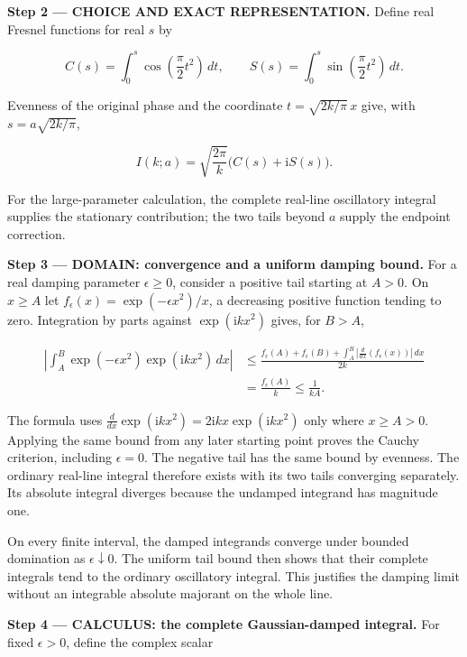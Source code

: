 \documentclass[11pt,oneside,openany]{book}
\begin{document}
\begin{ChoiceStep}
\textbf{Step 2 --- CHOICE AND EXACT REPRESENTATION.} Define real Fresnel functions for real \(s\) by

\[
C(s)=\int_0^s\cos\left(\frac\pi2t^2\right)\,dt,
\qquad
S(s)=\int_0^s\sin\left(\frac\pi2t^2\right)\,dt.
\]

Evenness of the original phase and the coordinate \(t=\sqrt{2k/\pi}\,x\) give, with \(s=a\sqrt{2k/\pi}\),

\[
I(k;a)=\sqrt{\frac{2\pi}{k}}\bigl(C(s)+\mathrm{i}S(s)\bigr).
\]

For the large-parameter calculation, the complete real-line oscillatory integral supplies the stationary contribution; the two tails beyond \(a\) supply the endpoint correction.

\end{ChoiceStep}
\begin{DomainStep}
\textbf{Step 3 --- DOMAIN: convergence and a uniform damping bound.} For a real damping parameter \(\epsilon\ge0\), consider a positive tail starting at \(A>0\). On \(x\ge A\) let \(f_\epsilon(x)=\exp(-\epsilon x^2)/x\), a decreasing positive function tending to zero. Integration by parts against \(\exp(\mathrm{i}kx^2)\) gives, for \(B>A\),

\[
\begin{aligned}
\left|\int_A^B\exp(-\epsilon x^2)\exp(\mathrm{i}kx^2)\,dx\right|
&\le\frac{f_\epsilon(A)+f_\epsilon(B)+\int_A^B|\frac{d}{dx}(f_\epsilon(x))|\,dx}{2k}\\
&=\frac{f_\epsilon(A)}k\le\frac1{kA}.
\end{aligned}
\]

The formula uses \(\frac{d}{dx}\exp(\mathrm{i}kx^2)=2\mathrm{i}kx\exp(\mathrm{i}kx^2)\) only where \(x\ge A>0\). Applying the same bound from any later starting point proves the Cauchy criterion, including \(\epsilon=0\). The negative tail has the same bound by evenness. The ordinary real-line integral therefore exists with its two tails converging separately. Its absolute integral diverges because the undamped integrand has magnitude one.

On every finite interval, the damped integrands converge under bounded domination as \(\epsilon\downarrow0\). The uniform tail bound then shows that their complete integrals tend to the ordinary oscillatory integral. This justifies the damping limit without an integrable absolute majorant on the whole line.

\end{DomainStep}
\textbf{Step 4 --- CALCULUS: the complete Gaussian-damped integral.} For fixed \(\epsilon>0\), define the complex scalar
\end{document}
